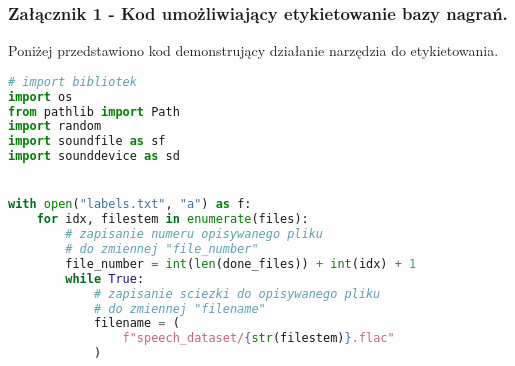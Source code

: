 
\subsubsection*{Załącznik 1 - Kod umożliwiający etykietowanie bazy nagrań.}

Poniżej przedstawiono kod demonstrujący działanie narzędzia do etykietowania.



\lstset{style=mystyle}

\begin{lstlisting}[language=Python, mathescape=true]
# import bibliotek
import os
from pathlib import Path
import random
import soundfile as sf
import sounddevice as sd


with open("labels.txt", "a") as f:
    for idx, filestem in enumerate(files):
        # zapisanie numeru opisywanego pliku 
        # do zmiennej "file_number"
        file_number = int(len(done_files)) + int(idx) + 1
        while True:
            # zapisanie sciezki do opisywanego pliku 
            # do zmiennej "filename"
            filename = (
                f"speech_dataset/{str(filestem)}.flac"
            )

          

\end{lstlisting}